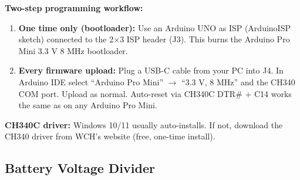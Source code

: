 \documentclass[a4paper,11pt]{article}
\renewcommand*{\,}{ }%
\begin{document}
\begin{diagrambox}
\end{diagrambox}

\begin{infobox}
\textbf{Two-step programming workflow:}
\begin{enumerate}[noitemsep]
  \item \textbf{One time only (bootloader):} Use an Arduino UNO as ISP (ArduinoISP sketch) connected to the 2$\times$3 ISP header (J3). This burns the Arduino Pro Mini 3.3\,V 8\,MHz bootloader.
  \item \textbf{Every firmware upload:} Plug a USB-C cable from your PC into J4. In Arduino IDE select ``Arduino Pro Mini'' $\to$ ``3.3\,V, 8\,MHz'' and the CH340 COM port. Upload as normal. Auto-reset via CH340C DTR\# + C14 works the same as on any Arduino Pro Mini.
\end{enumerate}
\textbf{CH340C driver:} Windows 10/11 usually auto-installs. If not, download the CH340 driver from WCH's website (free, one-time install).
\end{infobox}

\subsection{Battery Voltage Divider}
\end{document}
